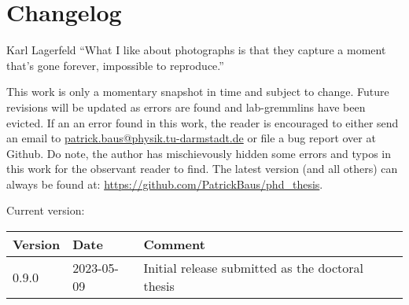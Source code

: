 \chapter{Changelog}
\begin{chapquote}{Karl Lagerfeld}
``What I like about photographs is that they capture a moment that’s gone forever, impossible to reproduce.''
\end{chapquote}

This work is only a momentary snapshot in time and subject to change. Future revisions will be updated as errors are found and lab-gremmlins have been evicted. If an an error found in this work, the reader is encouraged to either send an email to \url{patrick.baus@physik.tu-darmstadt.de} or file a bug report over at Github. Do note, the author has mischievously hidden some errors and typos in this work for the observant reader to find. The latest version (and all others) can always be found at: \url{https://github.com/PatrickBaus/phd_thesis}.
\begin{center}
    \begin{minipage}{0.8\linewidth}
        \centering
        Current version: \versionNumber
    \end{minipage}%
\end{center}

\begin{table}[h]
    \centering
    \begin{tabularx}{0.95\textwidth}{lll}
        Version& Date& Comment \\
        \hline
        0.9.0 &2023-05-09& Initial release submitted as the doctoral thesis
    \end{tabularx}
\end{table}
